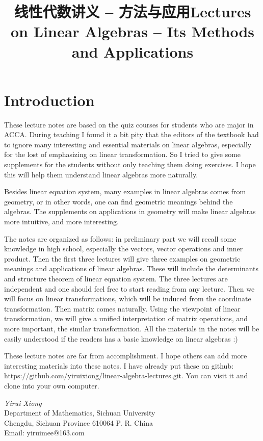 \documentclass[12pt,reqno]{article}
\theoremstyle{definition}
\begin{document}
\title{线性代数讲义 -- 方法与应用}
\maketitle
\newpage

\title{Lectures on Linear Algebras -- Its Methods and Applications}
\maketitle

\section*{Introduction}
These lecture notes are based on the quiz courses for students who are major in ACCA. During teaching I found it a bit pity that the editors of the textbook had to ignore many interesting and essential materials on linear algebras, especially for the lost of emphasizing on linear transformation. So I tried to give some supplements for the students without only teaching them doing exercises. I hope this will help them understand linear algebras more naturally.

Besides linear equation system, many examples in linear algebras comes from geometry, or in other words, one can find geometric meanings behind the algebras. The supplements on applications in geometry will make linear algebras more intuitive, and more interesting.

The notes are organized as follows: in preliminary part we will recall some knowledge in high school, especially the vectors, vector operations and inner product.  Then the first three lectures will give three examples on geometric meanings and applications of linear algebras. These will include the determinants and structure theorem of linear equation system. The three lectures are independent and one   should feel free to start reading from any lecture. Then we will focus on linear transformations, which will be induced from the coordinate transformation. Then matrix comes naturally.  Using the viewpoint of linear transformation, we will give a unified interpretation of matrix operations, and more important, the similar transformation. All the materials in the notes will be easily understood if the readers has a basic knowledge on linear algebras :)

These lecture notes are far from accomplishment. I hope others can add more interesting materials into these notes. I have already put these on github: https://github.com/yiruixiong/linear-algebra-lectures.git. You can visit it and clone into your own computer.
\begin{flushright}
\textit{
Yirui Xiong} \\
Department of Mathematics, Sichuan University \\ Chengdu, Sichuan Province 610064 P. R. China \\
Email: yiruimee@163.com

\end{flushright}
\end{document}
